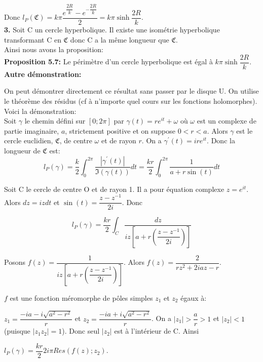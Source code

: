 \documentclass[a4paper, 12pt, twoside]{book}
\begin{document}
Donc $l_{P}(\mathfrak{C})=k\pi\dfrac{e^{\dfrac{2R}{k}}-e^{-\dfrac{2R}{k}}}{2}=k\pi\sinh \dfrac{2R}{k}$.\\

\textbf{3.} Soit C un cercle hyperbolique. Il existe une isométrie hyperbolique transformant C en $\mathfrak{C}$ donc C a la même longueur que $\mathfrak{C}$.\\

Ainsi nous avons la proposition:\\

\textbf{Proposition 5.7:} Le périmètre d'un cercle hyperbolique est égal à $k\pi\sinh \dfrac{2R}{k}$.\\

\textbf{Autre démonstration:}\

On peut démontrer directement ce résultat sans passer par le disque U. On utilise le théorème des résidus (cf à n'importe quel cours sur les fonctions holomorphes). Voici la démonstration:\\

Soit $\gamma$ le chemin défini sur $[0; 2\pi]$ par $\gamma(t)=re^{it}+\omega$ où $\omega$ est un complexe de partie imaginaire, $a$, strictement positive et on suppose $0<r<a$. Alors $\gamma$ est le cercle euclidien, $\mathfrak{C}$, de centre $\omega$ et de rayon $r$. On a $\gamma^{'}(t)=ire^{it}$. Donc la longueur de $\mathfrak{C}$ est:\\

 $$l_{P}(\gamma)=\dfrac{k}{2}\int_{0}^{2\pi} \dfrac{|\gamma^{'}(t)|}{\Im(\gamma(t))}dt=\dfrac{kr}{2}\int_{0}^{2\pi} \dfrac{1}{a+r\sin(t)}dt$$
 
 Soit C le cercle de centre O et de rayon 1. Il a pour équation complexe $z=e^{it}$. Alors $dz=izdt$ et $\sin(t)=\dfrac{z-z^{-1}}{2i}$. Donc\
 
 $$l_{P}(\gamma)=\dfrac{kr}{2}\int_{C} \dfrac{dz}{iz[a+r(\dfrac{z-z^{-1}}{2i})]}$$
 
 Posons $f(z)=\dfrac{1}{iz[a+r(\dfrac{z-z^{-1}}{2i})]}$. Alors $f(z)=\dfrac{2}{rz^{2}+2iaz-r}$.\
 
 $f$ est une fonction méromorphe de pôles simples $z_{1}$ et $z_{2}$ égaux à:\
 
 $z_{1}=\dfrac{-ia-i\sqrt{a^{2}-r^{2}}}{r}$ et  $z_{2}=\dfrac{-ia+i\sqrt{a^{2}-r^{2}}}{r}$. On a $|z_{1}|>\dfrac{a}{r}>1$ et $|z_{2}|<1$ (puisque $|z_{1}z_{2}|=1$). Donc seul $|z_{2}|$ est à l'intérieur de C. Ainsi\
 
 $l_{P}(\gamma)=\dfrac{kr}{2}2i\pi Res(f(z); z_{2})$.\
 
\end{document}
